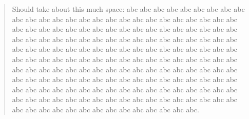 \begin{abstract}

Should take about this much space: \newline
abc abc abc abc abc abc abc abc abc abc abc abc abc abc abc abc abc abc abc abc abc abc abc abc abc abc abc abc abc abc abc abc abc abc abc abc abc abc abc abc abc abc abc abc
abc abc abc abc abc abc abc abc abc abc abc abc abc abc abc abc abc abc abc abc abc abc abc abc abc abc abc abc abc abc abc abc abc abc abc abc abc abc abc abc abc abc abc abc
abc abc abc abc abc abc abc abc abc abc abc abc abc abc abc abc abc abc abc abc abc abc abc abc abc abc abc abc abc abc abc abc abc abc abc abc abc abc abc abc abc abc abc abc
abc abc abc abc abc abc abc abc abc abc abc abc abc abc abc abc abc abc abc abc abc abc abc abc abc abc abc abc abc abc abc abc abc abc abc abc abc abc abc abc abc abc abc abc. 

\end{abstract}